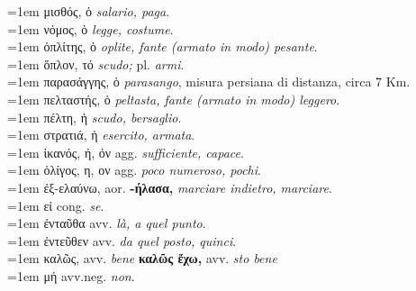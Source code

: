 \documentclass[nols]{tufte-handout}
\newcommand{\didobf}[1]{{\GFSDidotBf #1}}
\begin{document}
\begin{multicols}{2}
    \noindent \hangindent=1em \didobf{μισθός, ὁ} \textit{salario, paga}.  \\
    \noindent \hangindent=1em \didobf{νόμος, ὁ} \textit{legge, costume}.  \\
    \noindent \hangindent=1em \didobf{ὁπλίτης, ὁ} \textit{oplite, fante (armato in modo) pesante}.  \\
    \noindent \hangindent=1em \didobf{ὅπλον, τό} \textit{scudo;} pl. \textit{armi}.  \\
    \noindent \hangindent=1em \didobf{παρασάγγης, ὁ} \textit{parasango}, misura persiana di distanza, circa 7 Km.  \\
    \noindent \hangindent=1em \didobf{πελταστής, ὁ} \textit{peltasta, fante (armato in modo) leggero}.  \\
    \noindent \hangindent=1em \didobf{πέλτη, ἡ} \textit{scudo, bersaglio}.  \\
    \noindent \hangindent=1em \didobf{στρατιά, ἡ} \textit{esercito, armata}.  \\
    
	\noindent \hangindent=1em \didobf{ἱκανός, ή, όν} agg. \textit{sufficiente, capace}.  \\
	\noindent \hangindent=1em \didobf{ὀλίγος, η, ον} agg.  \textit{poco numeroso, pochi}.  \\
	
	\noindent \hangindent=1em \didobf{ἐξ-ελαύνω,} aor. \textbf{-ήλασα,} \textit{marciare indietro, marciare}. \\ 
	\noindent \hangindent=1em \didobf{εἰ} cong. \textit{se}.  \\
	
	\noindent \hangindent=1em \didobf{ἐνταῦθα} avv. \textit{là, a quel punto}.  \\
	\noindent \hangindent=1em \didobf{ἐντεῦθεν} avv. \textit{da quel posto, quinci}.  \\
	
	\noindent \hangindent=1em \didobf{καλῶς,} avv. \textit{bene}  \textbf{καλῶς ἔχω,} avv. \textit{sto bene} \\
	\noindent \hangindent=1em \didobf{μή} avv.neg. \textit{non}.
	
\end{multicols}

\end{document}
